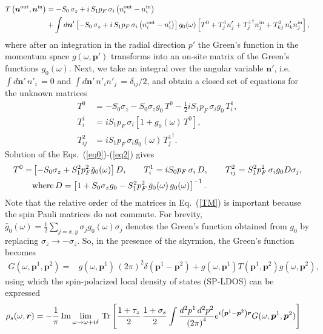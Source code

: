 \documentclass[twocolumn,showpacs,floatfix,longbibliography]{revtex4-1}
\begin{document}
\begin{widetext}
\begin{align}
	T\left(\bm n^{\rm out},\bm n^{\rm in}\right) &=  -S_0\,\sigma_z +  i \,S_1p_F \, \sigma_i \left(  n^{\rm out}_i-n^{\rm in}_i \right)   
	\\&+ \int d\bm n' \left[ -S_0\,\sigma_z +  i \,S_1p_F \, \sigma_i \left(  n^{\rm out}_i-n'_i \right) \right] g_0(\omega) \left[ T^0 + T^1_j n'_j + {T^1_j}^\dagger n^{\rm in}_j + T^2_{kj}\, n'_k n^{\rm in}_j \right],
	\label{integEq1}
\end{align}
where after an integration in the radial direction $p'$ the Green's function in the momentum space $g(\omega,\bm p')$ transforms into an on-site matrix of the Green's functions $g_0(\omega)$. Next, we take an integral over the angular variable $\bm n'$, i.e. $\int d\bm n'\, n'_i\, = 0$ and $\int d\bm n'\, n'_in'_j\, = \delta_{ij}/2$, and obtain a closed set of equations for the unknown matrices
\begin{align}
	T^0 &= -S_0\sigma_z-S_0\sigma_zg_0\,T^0-\frac12 iS_1p_F\,\sigma_ig_0\,T^1_i, \label{eq0} \\
	T^1_i &= iS_1p_F\,\sigma_i\left[1+g_0(\omega)\,T^0\right], \label{eq1} \\
	T^2_{ij} &= iS_1p_F\,\sigma_ig_0(\omega)\,{T^1_j}^\dagger. \label{eq2}
\end{align}
Solution of the Eqs.~(\ref{eq0})-(\ref{eq2}) gives
\begin{align}
	T^0 = &\left[ -S_0\sigma_z+S_1^2p_F^2\bar g_0(\omega) \right] D ,\qquad T^1_i = iS_0p_F\,\sigma_i\,D,\qquad T^2_{ij} = S_1^2p_F^2\,\sigma_ig_0D\sigma_j,  \label{TM} \\
	& {\rm where}\,D = \left[ 1+S_0\sigma_zg_{0}-S^2_1p_F^2\,\bar g_{0}(\omega)\, g_{0}(\omega) \right]^{-1}. \nonumber
\end{align}
Note that the relative order of the matrices in Eq.~(\ref{TM}) is important because the spin Pauli matrices do not commute. For brevity, $\bar g_0(\omega) = \frac{1}{2}\sum_{j=x,y} \sigma_j g_0(\omega) \sigma_j $ denotes the Green's function obtained from $g_{0}$ by replacing $\sigma_z \rightarrow - \sigma_z$. So, in the presence of the skyrmion, the Green's function becomes
\begin{align}
	G(\omega,\bm p^1,\bm p^2) =& g(\omega,\bm p^1)\,(2\pi)^2\delta(\bm p^1-\bm p^2) + g(\omega,\bm p^1) T(\bm p^1,\bm p^2) g(\omega,\bm p^2),
	\label{G}
\end{align}
using which the spin-polarized local density of states (SP-LDOS) can be expressed
\begin{align}
	\rho_s(\omega,\bm r) = -&\frac{1}{\pi}\,{\rm Im}\lim_{\omega\rightarrow \omega+i\delta}{\rm\,Tr} \left[ \frac{1+\tau_z}{2}\,\frac{1+\sigma_s}{2} \int \frac{d^2p^1\,d^2p^2}{\left( 2\pi \right)^4} e^{i\left( \bm p^1-\bm p^2 \right)\bm r} G(\omega,\bm p^1,\bm p^2)\right] \label{rhor}

\end{align}
\end{widetext}
\end{document}
